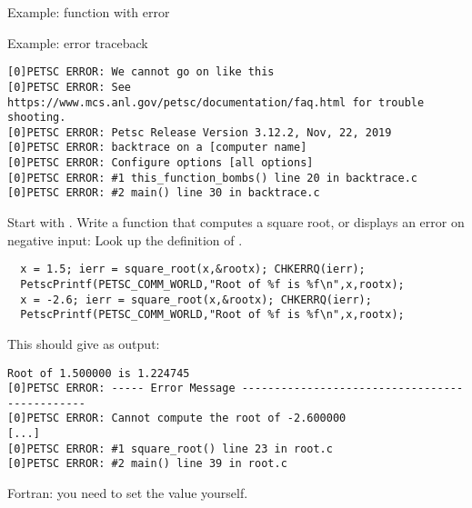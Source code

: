 \lstset{language=C}
\begin{details}


\begin{frame}[containsverbatim]{Example: function with error}
\end{frame}

\begin{frame}[containsverbatim]{Example: error traceback}
\footnotesize
\begin{verbatim}
[0]PETSC ERROR: We cannot go on like this
[0]PETSC ERROR: See https://www.mcs.anl.gov/petsc/documentation/faq.html for trouble shooting.
[0]PETSC ERROR: Petsc Release Version 3.12.2, Nov, 22, 2019
[0]PETSC ERROR: backtrace on a [computer name]
[0]PETSC ERROR: Configure options [all options]
[0]PETSC ERROR: #1 this_function_bombs() line 20 in backtrace.c
[0]PETSC ERROR: #2 main() line 30 in backtrace.c
\end{verbatim}
\end{frame}

\begin{exerciseframe}[root]
Start with . Write a function that computes a square root,
or displays an error on negative input:
Look up the definition of .
\begin{lstlisting}
  x = 1.5; ierr = square_root(x,&rootx); CHKERRQ(ierr);
  PetscPrintf(PETSC_COMM_WORLD,"Root of %f is %f\n",x,rootx);
  x = -2.6; ierr = square_root(x,&rootx); CHKERRQ(ierr);
  PetscPrintf(PETSC_COMM_WORLD,"Root of %f is %f\n",x,rootx);
\end{lstlisting}
This should give as output:
\begin{verbatim}
Root of 1.500000 is 1.224745
[0]PETSC ERROR: ----- Error Message ----------------------------------------------
[0]PETSC ERROR: Cannot compute the root of -2.600000
[...]
[0]PETSC ERROR: #1 square_root() line 23 in root.c
[0]PETSC ERROR: #2 main() line 39 in root.c
\end{verbatim}
Fortran: you need to set the  value yourself.
\end{exerciseframe}


\end{details}
